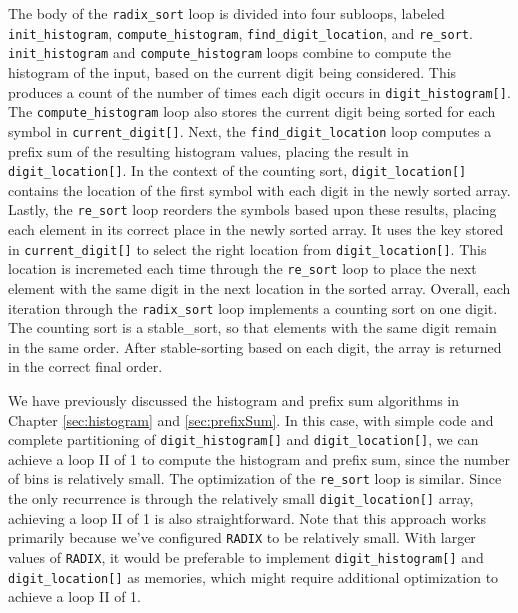 The body of the \lstinline{radix_sort} loop is divided into four subloops, labeled \lstinline{init_histogram}, \lstinline{compute_histogram}, \lstinline{find_digit_location}, and \lstinline{re_sort}.  \lstinline{init_histogram} and \lstinline{compute_histogram} loops combine to compute the histogram of the input, based on the current digit being considered.  This produces a count of the number of times each digit occurs in \lstinline{digit_histogram[]}.  The \lstinline{compute_histogram} loop also stores the current digit being sorted for each symbol in \lstinline{current_digit[]}.   Next, the \lstinline{find_digit_location} loop computes a prefix sum of the resulting histogram values, placing the result in \lstinline{digit_location[]}.  In the context of the counting sort, \lstinline{digit_location[]} contains the location of the first symbol with each digit in the newly sorted array.  Lastly, the \lstinline{re_sort} loop reorders the symbols based upon these results, placing each element in its correct place in the newly sorted array.    It uses the key stored in \lstinline{current_digit[]} to select the right location from \lstinline{digit_location[]}. This location is incremeted each time through the \lstinline{re_sort} loop to place the next element with the same digit in the next location in the sorted array.  Overall, each iteration through the \lstinline{radix_sort} loop implements a counting sort on one digit.  The counting sort is a \gls{stable_sort}, so that elements with the same digit remain in the same order.  After stable-sorting based on each digit, the array is returned in the correct final order.

We have previously discussed the histogram and prefix sum algorithms in Chapter \ref{sec:histogram} and \ref{sec:prefixSum}.  In this case, with simple code and complete partitioning of \lstinline{digit_histogram[]} and \lstinline{digit_location[]}, we can achieve a loop II of 1 to compute the histogram and prefix sum, since the number of bins is relatively small.  The optimization of the \lstinline{re_sort} loop is similar.  Since the only recurrence is through the relatively small \lstinline{digit_location[]} array, achieving a loop II of 1 is also straightforward.  Note that this approach works primarily because we've configured \lstinline{RADIX} to be relatively small.  With larger values of \lstinline{RADIX}, it would be preferable to implement \lstinline{digit_histogram[]} and \lstinline{digit_location[]} as memories, which might require additional optimization to achieve a loop II of 1.

